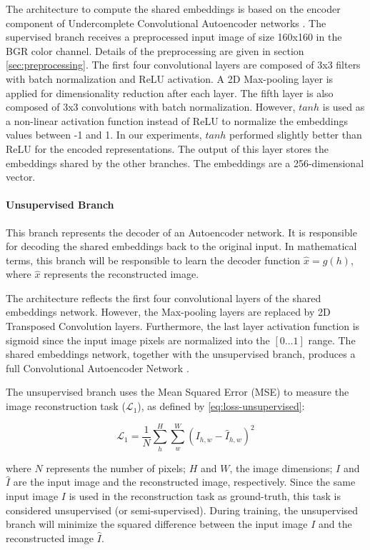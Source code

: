 The architecture to compute the shared embeddings is based on the encoder component of Undercomplete Convolutional Autoencoder networks \citep{goodfellow2016deep}. The supervised branch receives a preprocessed input image of size 160x160 in the BGR color channel. Details of the preprocessing are given in section \ref{sec:preprocessing}. The first four convolutional layers are composed of 3x3 filters with batch normalization and ReLU activation. A 2D Max-pooling layer is applied for dimensionality reduction after each layer. The fifth layer is also composed of 3x3 convolutions with batch normalization. However, $tanh$ is used as a non-linear activation function instead of ReLU to normalize the embeddings values between -1 and 1. In our experiments, $tanh$ performed slightly better than ReLU for the encoded representations. The output of this layer stores the embeddings shared by the other branches. The embeddings are a 256-dimensional vector.

\paragraph{Unsupervised Branch}

This branch represents the decoder of an Autoencoder network. It is responsible for decoding the shared embeddings back to the original input. In mathematical terms, this branch will be responsible to learn the decoder function $\hat{x} = g(h)$, where $\hat{x}$ represents the reconstructed image. 

The architecture reflects the first four convolutional layers of the shared embeddings network. However, the Max-pooling layers are replaced by 2D Transposed Convolution layers. Furthermore, the last layer activation function is sigmoid since the input image pixels are normalized into the $[0...1]$ range. The shared embeddings network, together with the unsupervised branch, produces a full Convolutional Autoencoder Network \citep{goodfellow2016deep}.

The unsupervised branch uses the Mean Squared Error (MSE) to measure the image reconstruction task ($\mathcal{L}_1$), as defined by \autoref{eq:loss-unsupervised}:

\begin{equation}
\label{eq:loss-unsupervised}
\mathcal{L}_1 = \frac{1}{N} \sum_h^H \sum_w^W ({I_{h,w} - \hat{I}_{h,w}})^2
\end{equation}

\noindent where $N$ represents the number of pixels; $H$ and $W$, the image dimensions; $I$ and $\hat{I}$ are the input image and the reconstructed image, respectively. Since the same input image $I$ is used in the reconstruction task as ground-truth, this task is considered unsupervised (or semi-supervised). During training, the unsupervised branch will minimize the squared difference between the input image $I$ and the reconstructed image $\hat{I}$.

